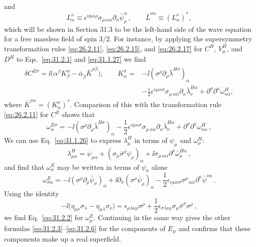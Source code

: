 and
\begin{equation}
  L^\nu_\alpha\equiv
  \epsilon^{\nu\mu\kappa\rho}
  \sigma_{\mu\,\alpha\dot\alpha}
  \partial_\kappa\bar\psi_\rho^{\dot\alpha}\,,
  \qquad
  \bar L^{\nu\dot\alpha}\equiv(L^\nu_\alpha)^*,
  \tag{31.2.8}\label{eq:31.2.8}
\end{equation}
which will be shown in Section 31.3 to be the left-hand side of the wave
equation for a free massless field of spin \(3/2\). For instance, by applying
the supersymmetry transformation rules \eqref{eq:26.2.11},
\eqref{eq:26.2.15}, and \eqref{eq:26.2.17} for \(C^H\), \(V_\mu^H\), and
\(D^H\) to Eqs.~\eqref{eq:31.2.1} and \eqref{eq:31.1.27} we find
\[
  \begin{aligned}
  \delta C^{E\sigma}
  =\ii\bigl(\alpha^\beta K^\sigma_\beta
  -\bar\alpha_{\dot\beta}\bar K^{\sigma\dot\beta}\bigr),\qquad
  K^\sigma_\alpha={}&
    -\ii(\sigma^\rho\partial_\rho\bar\lambda^{H\sigma})_\alpha\\
  &-\frac12\epsilon^{\nu\mu\kappa\sigma}
    \sigma_{\mu\,\alpha\dot\alpha}
    \partial_\kappa\bar\lambda_\nu^{H\dot\alpha}
    +\partial^\sigma\partial^\kappa\omega_{\kappa\alpha}^H ,
  \end{aligned}
\]
where \(\bar K^{\sigma\dot\alpha}=(K^\sigma_\alpha)^*\).
Comparison of this with the transformation rule \eqref{eq:26.2.11} for
\(C^E\) shows that
\[
  \omega^{E\sigma}_\alpha
  =-\ii(\sigma^\rho\partial_\rho\bar\lambda^{H\sigma})_\alpha
   -\frac12\epsilon^{\nu\mu\kappa\sigma}
    \sigma_{\mu\,\alpha\dot\alpha}
    \partial_\kappa\bar\lambda_\nu^{H\dot\alpha}
   +\partial^\sigma\partial^\kappa\omega_{\kappa\alpha}^H\,,
\]
We can use Eq.~\eqref{eq:31.1.26} to express \(\lambda_\mu^H\) in terms of
\(\psi_\mu\) and \(\omega_\mu^H\):
\[
  \lambda_{\mu\alpha}^H
  =\psi_{\mu\alpha}
   +(\sigma_\mu\bar\sigma^\rho\psi_\rho)_\alpha
   +\ii\sigma_{\mu\,\alpha\dot\alpha}
     \partial^\rho\bar\omega_\rho^{H\dot\alpha}\,,
\]
and find that \(\omega_\sigma^E\) may be written in terms of \(\psi_\sigma\)
alone
\[
  \omega_{\sigma\alpha}^E
  =-\ii(\sigma^\rho\partial_\rho\bar\psi_\sigma)_\alpha
   +\ii\partial_\sigma
      (\sigma^\rho\bar\psi_\rho)_\alpha
   -\frac12\epsilon_{\nu\mu\kappa\sigma}
    \sigma^{\mu}{}_{\alpha\dot\alpha}
    \partial^\kappa\bar\psi^{\nu\dot\alpha}\,.
\]
Using the identity
\[
  -\ii\bigl(\eta_{\mu\nu}\sigma_\lambda
          -\eta_{\mu\lambda}\sigma_\nu\bigr)
  =\epsilon_{\mu\lambda\nu\rho}\sigma^\rho
   +\frac12\epsilon_{\sigma\lambda\nu\rho}
     \sigma_\mu\bar\sigma^\sigma\sigma^\rho\,,
\]
we find Eq.~\eqref{eq:31.2.2} for \(\omega_\mu^E\). Continuing in the same
way gives the other formulas \eqref{eq:31.2.3}--\eqref{eq:31.2.6} for the
components of \(E_\mu\) and confirms that these components make up a real
superfield.

